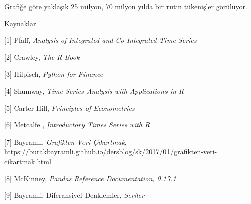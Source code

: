 \documentclass[12pt,fleqn]{article}\usepackage{../../common}
\begin{document}
Grafiğe göre yaklaşık 25 milyon, 70 milyon yılda bir rutin tükenişler görülüyor.

Kaynaklar

[1] Pfaff, {\em Analysis of Integrated and Co-Integrated Time Series}

[2] Crawley, {\em The R Book}

[3] Hilpisch, {\em Python for Finance}

[4] Shumway, {\em Time Series Analysis with Applications in R}

[5] Carter Hill, {\em Principles of Econometrics}

[6] Metcalfe , {\em Introductory Times Series with R}

[7] Bayramlı, 
    {\em Grafikten Veri Çıkartmak}, 
    \url{https://burakbayramli.github.io/dersblog/sk/2017/01/grafikten-veri-cikartmak.html}

[8] McKinney, {\em Pandas Reference Documentation, 0.17.1}

[9] Bayramli, Diferansiyel Denklemler, {\em Seriler}
\end{document}
